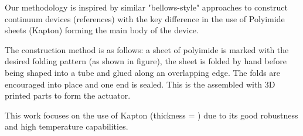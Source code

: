 Our methodology is inspired by similar "bellows-style" approaches to construct continuum devices (references) with the  key difference in the use of Polyimide sheets (Kapton) forming the main body of the device.

The construction method is as follows: a sheet of polyimide is marked with the desired folding pattern (as shown in figure), the sheet is folded by hand before being shaped into a tube and glued along an overlapping edge. The folds are encouraged into place and one end is sealed. This is the assembled with 3D printed parts to form the actuator.

This work focuses on the use of Kapton (thickness = ) due to its good robustness and high temperature capabilities.

